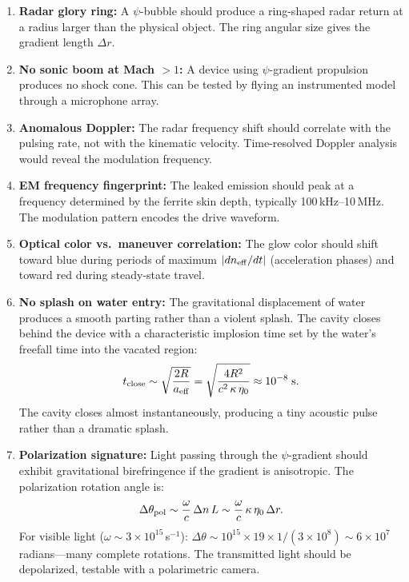 \documentclass[11pt]{article}
\newcommand{\neff}{n_{\rm eff}}
\begin{document}
\begin{enumerate}
\item \textbf{Radar glory ring:} A $\psi$-bubble should produce a
  ring-shaped radar return at a radius larger than the physical object.
  The ring angular size gives the gradient length $\Delta r$.

\item \textbf{No sonic boom at Mach $> 1$:} A device using $\psi$-gradient
  propulsion produces no shock cone. This can be tested by flying an
  instrumented model through a microphone array.

\item \textbf{Anomalous Doppler:} The radar frequency shift should
  correlate with the pulsing rate, not with the kinematic velocity.
  Time-resolved Doppler analysis would reveal the modulation frequency.

\item \textbf{EM frequency fingerprint:} The leaked emission should
  peak at a frequency determined by the ferrite skin depth, typically
  100\,kHz--10\,MHz. The modulation pattern encodes the drive waveform.

\item \textbf{Optical color vs.\ maneuver correlation:} The glow color
  should shift toward blue during periods of maximum $|d\neff/dt|$
  (acceleration phases) and toward red during steady-state travel.

\item \textbf{No splash on water entry:} The gravitational displacement
  of water produces a smooth parting rather than a violent splash. The
  cavity closes behind the device with a characteristic implosion time
  set by the water's freefall time into the vacated region:
  \begin{equation}
  t_{\rm close} \sim \sqrt{\frac{2R}{a_{\rm eff}}}
    = \sqrt{\frac{4R^2}{c^2\,\kappa\,\eta_0}}
    \approx 10^{-8}\;\text{s}.
  \end{equation}
  The cavity closes almost instantaneously, producing a tiny acoustic
  pulse rather than a dramatic splash.

\item \textbf{Polarization signature:} Light passing through the
  $\psi$-gradient should exhibit gravitational birefringence if the
  gradient is anisotropic. The polarization rotation angle is:
  \begin{equation}
  \Delta\theta_{\rm pol} \sim \frac{\omega}{c}\,\Delta n\,L
    \sim \frac{\omega}{c}\,\kappa\,\eta_0\,\Delta r.
  \end{equation}
  For visible light ($\omega \sim 3 \times 10^{15}$\,s$^{-1}$):
  $\Delta\theta \sim 10^{15} \times 19 \times 1/(3 \times 10^8)
  \sim 6 \times 10^7$\,radians---many complete rotations. The
  transmitted light should be depolarized, testable with a polarimetric
  camera.
\end{enumerate}
\end{document}
